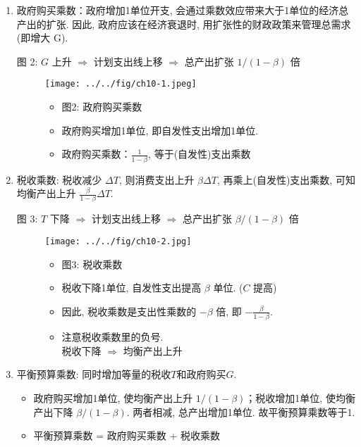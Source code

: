 \documentclass[11pt]{ctexart}
\begin{document}
\begin{enumerate}
\def\labelenumi{\arabic{enumi}.}
\item
  政府购买乘数：政府增加1单位开支, 会通过乘数效应带来大于1单位的经济总产出的扩张. 因此, 政府应该在经济衰退时, 用扩张性的财政政策来管理总需求(即增大 G). 
  
  图 2: $G$ 上升 $\Rightarrow$ 计划支出线上移 $\Rightarrow$ 总产出扩张 $1/ (1-\beta)$ 倍

\begin{figure}[H]
\centering
\begin{minipage}{.55\textwidth}
  \texttt{[image: ../../fig/ch10-1.jpeg]}

\end{minipage}%
\begin{minipage}{.4\textwidth}
  \begin{itemize}
  \item 
    图2:  政府购买乘数
  \item 
    政府购买增加1单位, 即自发性支出增加1单位. 
  \item
    政府购买乘数：$\frac{1}{1-\beta}$, 等于(自发性)支出乘数
  \end{itemize}
\end{minipage}
\end{figure}

\item
  税收乘数: 税收减少 $\Delta T$,  则消费支出上升 $\beta \Delta T$, 
  再乘上(自发性)支出乘数, 可知均衡产出上升 $\frac{\beta}{1- \beta} \Delta T $.
  
  图 3: $T$ 下降 $\Rightarrow$ 计划支出线上移 $\Rightarrow$ 总产出扩张 $\beta/ (1-\beta)$ 倍
\begin{figure}[H]
\centering
\begin{minipage}{.55\textwidth}
  \texttt{[image: ../../fig/ch10-2.jpg]}
\end{minipage}%
\begin{minipage}{.4\textwidth}

  \begin{itemize}
  \item 
    图3: 税收乘数
  \item 
    税收下降1单位, 自发性支出提高 $\beta$ 单位.  ($C$ 提高)
  \item 
    因此, 税收乘数是支出性乘数的 $-\beta$ 倍,  即 $- \frac{\beta}{1- \beta}$.
  \item 注意税收乘数里的负号. \\ 税收下降 $\Rightarrow$ 均衡产出上升 
  \end{itemize}
\end{minipage}
\end{figure}
\item 
  平衡预算乘数: 同时增加等量的税收$T$和政府购买$G$.
  \begin{itemize}
    \item   
    政府购买增加1单位, 使均衡产出上升 $1/ (1-\beta)$；税收增加1单位, 使均衡产出下降 $\beta/ (1-\beta)$.
    两者相减, 总产出增加1单位. 故平衡预算乘数等于1.
    \item
    平衡预算乘数 = 政府购买乘数 + 税收乘数
  \end{itemize}
\end{enumerate}
\end{document}
